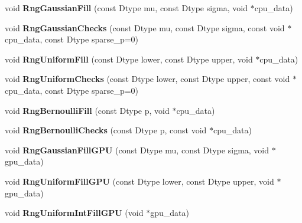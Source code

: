 \begin{DoxyCompactItemize}
void {\bfseries Rng\+Gaussian\+Fill} (const Dtype mu, const Dtype sigma, void $\ast$cpu\+\_\+data)
\item 
\mbox{\label{classcaffe_1_1_random_number_generator_test_a1710186e01feea820951e6b31d7ed8d5}} 
void {\bfseries Rng\+Gaussian\+Checks} (const Dtype mu, const Dtype sigma, const void $\ast$cpu\+\_\+data, const Dtype sparse\+\_\+p=0)
\item 
\mbox{\label{classcaffe_1_1_random_number_generator_test_ae645743499118e0d5a4f09df5f617547}} 
void {\bfseries Rng\+Uniform\+Fill} (const Dtype lower, const Dtype upper, void $\ast$cpu\+\_\+data)
\item 
\mbox{\label{classcaffe_1_1_random_number_generator_test_adda371a2186747f91efa3bdd400c95f1}} 
void {\bfseries Rng\+Uniform\+Checks} (const Dtype lower, const Dtype upper, const void $\ast$cpu\+\_\+data, const Dtype sparse\+\_\+p=0)
\item 
\mbox{\label{classcaffe_1_1_random_number_generator_test_af2759f33fedb94c8cf324a61081fe61e}} 
void {\bfseries Rng\+Bernoulli\+Fill} (const Dtype p, void $\ast$cpu\+\_\+data)
\item 
\mbox{\label{classcaffe_1_1_random_number_generator_test_ac44cfd5c9c9a09961e1385e95dc91e22}} 
void {\bfseries Rng\+Bernoulli\+Checks} (const Dtype p, const void $\ast$cpu\+\_\+data)
\item 
\mbox{\label{classcaffe_1_1_random_number_generator_test_ac85fa67278accad52bc31d89d220bec9}} 
void {\bfseries Rng\+Gaussian\+Fill\+G\+PU} (const Dtype mu, const Dtype sigma, void $\ast$gpu\+\_\+data)
\item 
\mbox{\label{classcaffe_1_1_random_number_generator_test_a56f2663c29c44445369573d484a6d1ca}} 
void {\bfseries Rng\+Uniform\+Fill\+G\+PU} (const Dtype lower, const Dtype upper, void $\ast$gpu\+\_\+data)
\item 
\mbox{\label{classcaffe_1_1_random_number_generator_test_ae731201dd6d8c588306e044787a64954}} 
void {\bfseries Rng\+Uniform\+Int\+Fill\+G\+PU} (void $\ast$gpu\+\_\+data)
\end{DoxyCompactItemize}
